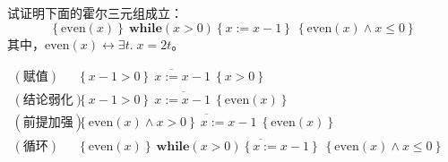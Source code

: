 \documentclass[11pt,a4paper]{article}
\begin{document}
\subproblem 试证明下面的霍尔三元组成立：
$$\left\{\text{even}(x)\right\}\ \textbf{while}(x>0)\left\{x:=x-1\right\}\ \left\{\text{even}(x)\wedge x\le 0\right\}$$
其中，$\text{even}(x) \leftrightarrow \exists t.\;x = 2t$。
\begin{solution}
\end{solution}
	\begin{align*}
		(\text{赋值})&\overline{\left\{ x-1>0\right\}\ x:=x-1\ \left\{x>0\right\}}& \\
		(\text{结论弱化})&\overline{\left\{ x-1>0\right\}\ x:=x-1\ \left\{\text{even}(x)\right\}}& \\
		(\text{前提加强})&\overline{\left\{\text{even}(x)\wedge x> 0\right\}\ x:=x-1\ \left\{\text{even}(x)\right\}}& \\
		(\text{循环})&\overline{\left\{\text{even}(x)\right\}\ \textbf{while}(x>0)\left\{x:=x-1\right\}\ \left\{\text{even}(x)\wedge x\le 0\right\}}&
	\end{align*}
\end{document}
